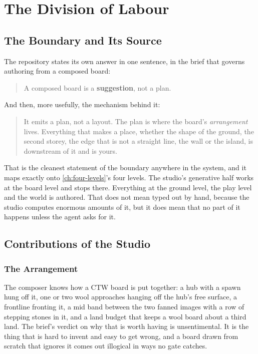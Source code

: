 \chapter{The Division of Labour}
\label{ch:division}

\section{The Boundary and Its Source}

The repository states its own answer in one sentence, in the brief that governs
authoring from a composed board:

\begin{quote}
A composed board is a \textbf{suggestion}, not a plan.
\end{quote}

And then, more usefully, the mechanism behind it:

\begin{quote}
It emits a plan, not a layout. The plan is where the board's \emph{arrangement}
lives. Everything that makes a place, whether the shape of the ground, the second
storey, the edge that is not a straight line, the wall or the island, is
downstream of it and is yours.
\end{quote}

That is the cleanest statement of the boundary anywhere in the system, and it maps
exactly onto \cref{ch:four-levels}'s four levels. The studio's generative half
works at the board level and stops there. Everything at the ground level, the play
level and the world is authored. That does not mean typed out by hand, because the
studio computes enormous amounts of it, but it does mean that no part of it
happens unless the agent asks for it.

\section{Contributions of the Studio}

\subsection{The Arrangement}

The composer knows how a CTW board is put together: a hub with a spawn hung off
it, one or two wool approaches hanging off the hub's free surface, a frontline
fronting it, a mid band between the two fanned images with a row of stepping
stones in it, and a land budget that keeps a wool board about a third land. The
brief's verdict on why that is worth having is unsentimental. It is the thing that
is hard to invent and easy to get wrong, and a board drawn from scratch that
ignores it comes out illogical in ways no gate catches.

